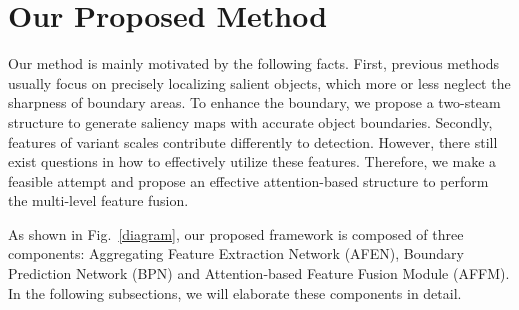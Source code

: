 \documentclass[journal]{IEEEtran}
\begin{document}
\section{Our Proposed Method}
\label{sec:previous work}
Our method is mainly motivated by the following facts.
First, previous methods usually focus on precisely localizing salient objects, which more or less neglect the sharpness of boundary areas.
To enhance the boundary, we propose a two-steam structure to generate saliency maps with accurate object boundaries.
Secondly, features of variant scales contribute differently to detection.
However, there still exist questions in how to effectively utilize these features.
Therefore, we make a feasible attempt and propose an effective attention-based structure to perform the multi-level feature fusion.

As shown in Fig.~\ref{diagram}, our proposed framework is composed of three components: Aggregating Feature Extraction Network (AFEN), Boundary Prediction Network (BPN) and Attention-based Feature Fusion Module (AFFM).
In the following subsections, we will elaborate these components in detail.
\vspace{-2mm}
\end{document}
